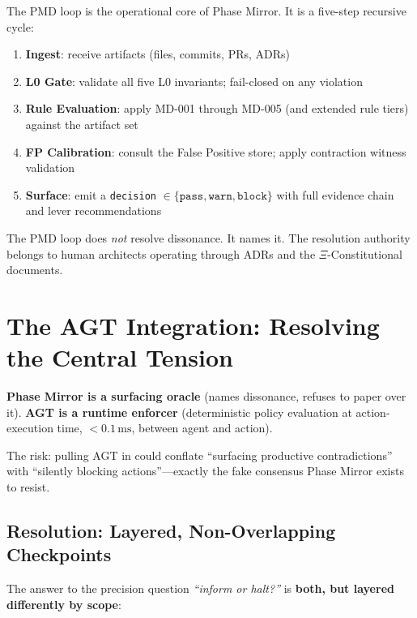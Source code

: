 \documentclass[12pt,a4paper]{article}
\theoremstyle{definition}
\theoremstyle{remark}
\begin{document}
The PMD loop is the operational core of Phase Mirror. It is a five-step
recursive cycle:

\begin{enumerate}[label=\textbf{PMD-\arabic*}]
  \item \textbf{Ingest}: receive artifacts (files, commits, PRs, ADRs)
  \item \textbf{L0 Gate}: validate all five L0 invariants; fail-closed on any violation
  \item \textbf{Rule Evaluation}: apply MD-001 through MD-005 (and extended rule tiers)
    against the artifact set
  \item \textbf{FP Calibration}: consult the False Positive store; apply
    contraction witness validation
  \item \textbf{Surface}: emit a \texttt{decision} $\in \{\texttt{pass},
    \texttt{warn}, \texttt{block}\}$ with full evidence chain and lever
    recommendations
\end{enumerate}

The PMD loop does \emph{not} resolve dissonance. It names it. The resolution
authority belongs to human architects operating through ADRs and the
$\Xi$-Constitutional documents.


\section{The AGT Integration: Resolving the Central Tension}

\begin{tensionbox}
\textbf{Phase Mirror is a surfacing oracle} (names dissonance, refuses to paper
over it). \textbf{AGT is a runtime enforcer} (deterministic policy evaluation
at action-execution time, $< 0.1\,\text{ms}$, between agent and action).

The risk: pulling AGT in could conflate ``surfacing productive contradictions''
with ``silently blocking actions''---exactly the fake consensus Phase Mirror
exists to resist.
\end{tensionbox}

\subsection{Resolution: Layered, Non-Overlapping Checkpoints}

The answer to the precision question \emph{``inform or halt?''} is
\textbf{both, but layered differently by scope}:
\end{document}
